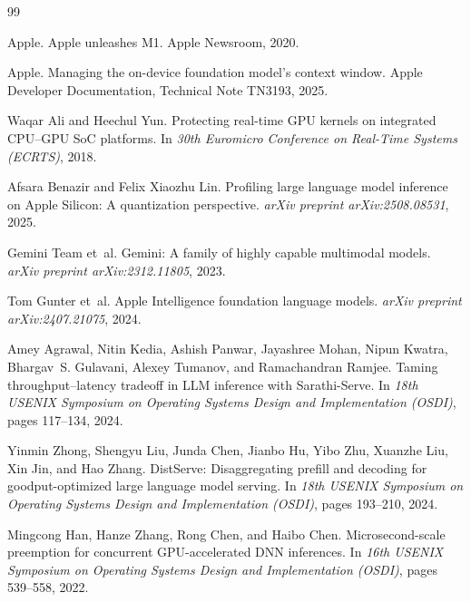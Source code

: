 \documentclass{article}
\begin{document}
\newpage
{\small
\begin{thebibliography}{99}

Apple.
\newblock Apple unleashes M1.
\newblock Apple Newsroom, 2020.

Apple.
\newblock Managing the on-device foundation model's context window.
\newblock Apple Developer Documentation, Technical Note TN3193, 2025.

Waqar Ali and Heechul Yun.
\newblock Protecting real-time GPU kernels on integrated CPU--GPU SoC platforms.
\newblock In \emph{30th Euromicro Conference on Real-Time Systems (ECRTS)}, 2018.

Afsara Benazir and Felix Xiaozhu Lin.
\newblock Profiling large language model inference on Apple Silicon: A quantization perspective.
\newblock \emph{arXiv preprint arXiv:2508.08531}, 2025.

Gemini Team et~al.
\newblock Gemini: A family of highly capable multimodal models.
\newblock \emph{arXiv preprint arXiv:2312.11805}, 2023.

Tom Gunter et~al.
\newblock Apple Intelligence foundation language models.
\newblock \emph{arXiv preprint arXiv:2407.21075}, 2024.

Amey Agrawal, Nitin Kedia, Ashish Panwar, Jayashree Mohan, Nipun Kwatra, Bhargav~S. Gulavani, Alexey Tumanov, and Ramachandran Ramjee.
\newblock Taming throughput--latency tradeoff in LLM inference with Sarathi-Serve.
\newblock In \emph{18th USENIX Symposium on Operating Systems Design and Implementation (OSDI)}, pages 117--134, 2024.

Yinmin Zhong, Shengyu Liu, Junda Chen, Jianbo Hu, Yibo Zhu, Xuanzhe Liu, Xin Jin, and Hao Zhang.
\newblock DistServe: Disaggregating prefill and decoding for goodput-optimized large language model serving.
\newblock In \emph{18th USENIX Symposium on Operating Systems Design and Implementation (OSDI)}, pages 193--210, 2024.

Mingcong Han, Hanze Zhang, Rong Chen, and Haibo Chen.
\newblock Microsecond-scale preemption for concurrent GPU-accelerated DNN inferences.
\newblock In \emph{16th USENIX Symposium on Operating Systems Design and Implementation (OSDI)}, pages 539--558, 2022.


\end{thebibliography}}
\end{document}
